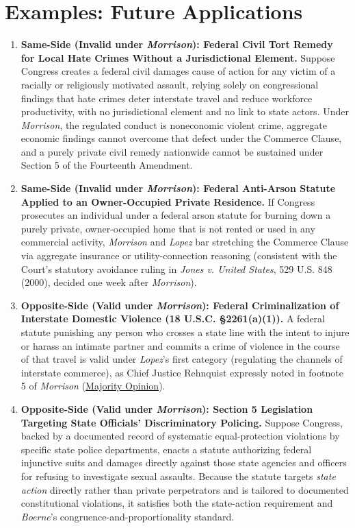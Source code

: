 \documentclass[12pt]{article}
\begin{document}
\section{Examples: Future Applications}
\begin{enumerate}
\item \textbf{Same-Side (Invalid under \textit{Morrison}): Federal Civil Tort Remedy for Local Hate Crimes Without a Jurisdictional Element.} Suppose Congress creates a federal civil damages cause of action for any victim of a racially or religiously motivated assault, relying solely on congressional findings that hate crimes deter interstate travel and reduce workforce productivity, with no jurisdictional element and no link to state actors. Under \textit{Morrison}, the regulated conduct is noneconomic violent crime, aggregate economic findings cannot overcome that defect under the Commerce Clause, and a purely private civil remedy nationwide cannot be sustained under Section 5 of the Fourteenth Amendment.
\item \textbf{Same-Side (Invalid under \textit{Morrison}): Federal Anti-Arson Statute Applied to an Owner-Occupied Private Residence.} If Congress prosecutes an individual under a federal arson statute for burning down a purely private, owner-occupied home that is not rented or used in any commercial activity, \textit{Morrison} and \textit{Lopez} bar stretching the Commerce Clause via aggregate insurance or utility-connection reasoning (consistent with the Court's statutory avoidance ruling in \textit{Jones v. United States}, 529 U.S. 848 (2000), decided one week after \textit{Morrison}).
\item \textbf{Opposite-Side (Valid under \textit{Morrison}): Federal Criminalization of Interstate Domestic Violence (18 U.S.C. \S 2261(a)(1)).} A federal statute punishing any person who crosses a state line with the intent to injure or harass an intimate partner and commits a crime of violence in the course of that travel is valid under \textit{Lopez}'s first category (regulating the channels of interstate commerce), as Chief Justice Rehnquist expressly noted in footnote 5 of \textit{Morrison} (\href{https://www.law.cornell.edu/supct/html/99-5.ZO.html}{Majority Opinion}).
\item \textbf{Opposite-Side (Valid under \textit{Morrison}): Section 5 Legislation Targeting State Officials' Discriminatory Policing.} Suppose Congress, backed by a documented record of systematic equal-protection violations by specific state police departments, enacts a statute authorizing federal injunctive suits and damages directly against those state agencies and officers for refusing to investigate sexual assaults. Because the statute targets \textit{state action} directly rather than private perpetrators and is tailored to documented constitutional violations, it satisfies both the state-action requirement and \textit{Boerne}'s congruence-and-proportionality standard.

\end{enumerate}
\end{document}
